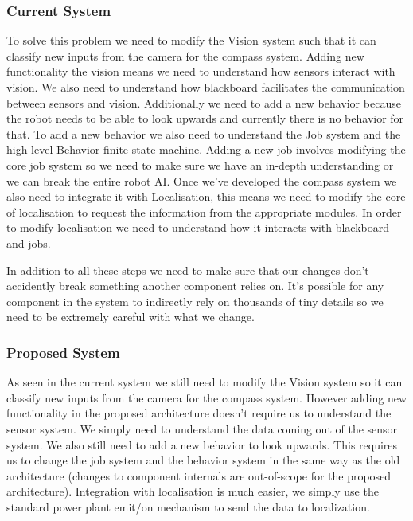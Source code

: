 \documentclass[english,12pt]{scrartcl}
\begin{document}
			\subsubsection{Current System}
				To solve this problem we need to modify the Vision system such that it can classify new inputs
				from the camera for the compass system. 
				Adding new functionality the vision means we need to understand how sensors interact with vision. 
				We also need to understand how blackboard facilitates the communication between sensors and vision.
				Additionally we need to add a new behavior because the robot needs to be able to look upwards and currently
				there is no behavior for that.
				To add a new behavior we also need to understand the Job system and the high level Behavior finite state machine.
				Adding a new job involves modifying the core job system so we need to make sure we have an in-depth understanding
				or we can break the entire robot AI.
				Once we've developed the compass system we also need to integrate it with Localisation, this means we need to
				modify the core of localisation to request the information from the appropriate modules. In order to modify
				localisation we need to understand how it interacts with blackboard and jobs.
				
				In addition to all these steps we need to make sure that our changes don't accidently break something another component
				relies on. It's possible for any component in the system to indirectly rely on thousands of tiny details so we need to be extremely
				careful with what we change.
				
			\subsubsection{Proposed System}
				As seen in the current system we still need to modify the Vision system so it can classify new inputs from
				the camera for the compass system. 
				However adding new functionality in the proposed architecture doesn't require us to understand the sensor system.
				We simply need to understand the data coming out of the sensor system.
				We also still need to add a new behavior to look upwards. This requires us to change the job system and the behavior system in
				the same way as the old architecture (changes to component internals are out-of-scope for the proposed architecture).
				Integration with localisation is much easier, we simply use the standard power plant emit/on mechanism to send the data to localization.
				
\end{document}
